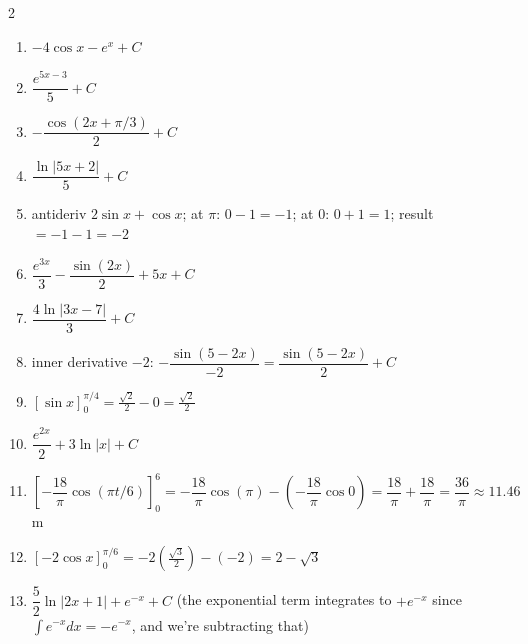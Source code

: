 \documentclass[11pt]{article}
\begin{document}
\begin{keybox}
\begin{multicols}{2}
\small
\begin{enumerate}[leftmargin=*,itemsep=3pt]
  \item $-4\cos x-e^x+C$
  \item $\dfrac{e^{5x-3}}{5}+C$
  \item $-\dfrac{\cos(2x+\pi/3)}{2}+C$
  \item $\dfrac{\ln|5x+2|}{5}+C$
  \item antideriv $2\sin x+\cos x$; at $\pi$: $0-1=-1$; at $0$: $0+1=1$; result $=-1-1=-2$
  \item $\dfrac{e^{3x}}{3}-\dfrac{\sin(2x)}{2}+5x+C$
  \item $\dfrac{4\ln|3x-7|}3+C$
  \item inner derivative $-2$: $-\dfrac{\sin(5-2x)}{-2}=\dfrac{\sin(5-2x)}2+C$
  \item $[\sin x]_0^{\pi/4}=\tfrac{\sqrt2}2-0=\tfrac{\sqrt2}2$
  \item $\dfrac{e^{2x}}2+3\ln|x|+C$
  \item $\left[-\dfrac{18}\pi\cos(\pi t/6)\right]_0^6=-\dfrac{18}\pi\cos(\pi)-\left(-\dfrac{18}\pi\cos0\right)=\dfrac{18}\pi+\dfrac{18}\pi=\dfrac{36}\pi\approx11.46$ m
  \item $[-2\cos x]_0^{\pi/6}=-2(\tfrac{\sqrt3}2)-(-2)=2-\sqrt3$
  \item $\dfrac52\ln|2x+1|+e^{-x}+C$ (the exponential term integrates to $+e^{-x}$ since $\int e^{-x}dx=-e^{-x}$, and we're subtracting that)
\end{enumerate}
\end{multicols}
\end{keybox}
\end{document}
